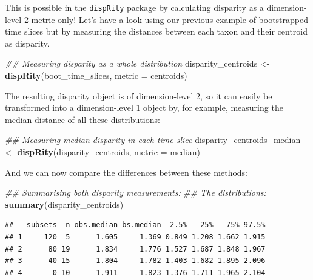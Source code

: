 \documentclass[]{book}
\newenvironment{Shaded}{\begin{snugshade}}{\end{snugshade}}
\newcommand{\CommentTok}[1]{\textcolor[rgb]{0.56,0.35,0.01}{\textit{#1}}}
\newcommand{\DataTypeTok}[1]{\textcolor[rgb]{0.13,0.29,0.53}{#1}}
\newcommand{\KeywordTok}[1]{\textcolor[rgb]{0.13,0.29,0.53}{\textbf{#1}}}
\newcommand{\NormalTok}[1]{#1}
\newcommand{\StringTok}[1]{\textcolor[rgb]{0.31,0.60,0.02}{#1}}
\begin{document}
This is possible in the \texttt{dispRity} package by calculating disparity as a dimension-level 2 metric only!
Let's have a look using our \protect\hyperlink{summarising-dispRity-data-plots}{previous example} of bootstrapped time slices but by measuring the distances between each taxon and their centroid as disparity.

\begin{Shaded}
\begin{Highlighting}[]
\CommentTok{## Measuring disparity as a whole distribution}
\NormalTok{disparity_centroids <-}\StringTok{ }\KeywordTok{dispRity}\NormalTok{(boot_time_slices, }
                                \DataTypeTok{metric =}\NormalTok{ centroids)}
\end{Highlighting}
\end{Shaded}

The resulting disparity object is of dimension-level 2, so it can easily be transformed into a dimension-level 1 object by, for example, measuring the median distance of all these distributions:

\begin{Shaded}
\begin{Highlighting}[]
\CommentTok{## Measuring median disparity in each time slice}
\NormalTok{disparity_centroids_median <-}\StringTok{ }\KeywordTok{dispRity}\NormalTok{(disparity_centroids,}
                                       \DataTypeTok{metric =}\NormalTok{ median)}
\end{Highlighting}
\end{Shaded}

And we can now compare the differences between these methods:

\begin{Shaded}
\begin{Highlighting}[]
\CommentTok{## Summarising both disparity measurements:}
\CommentTok{## The distributions:}
\KeywordTok{summary}\NormalTok{(disparity_centroids)}
\end{Highlighting}
\end{Shaded}

\begin{verbatim}
##   subsets  n obs.median bs.median  2.5%   25%   75% 97.5%
## 1     120  5      1.605     1.369 0.849 1.208 1.662 1.915
## 2      80 19      1.834     1.776 1.527 1.687 1.848 1.967
## 3      40 15      1.804     1.782 1.403 1.682 1.895 2.096
## 4       0 10      1.911     1.823 1.376 1.711 1.965 2.104
\end{verbatim}
\end{document}
